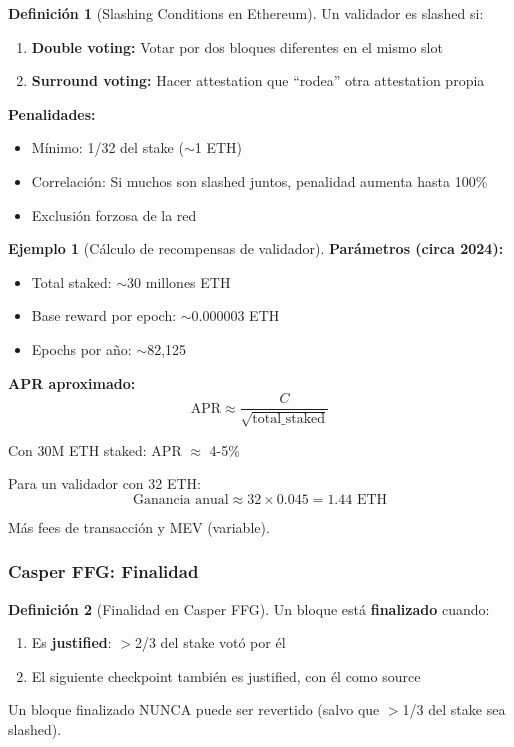 \documentclass[11pt,a4paper,twoside,openright]{book}
\theoremstyle{definition}
\newtheorem{definition}{Definición}[chapter]
\newtheorem{example}{Ejemplo}[chapter]
\theoremstyle{plain}
\theoremstyle{remark}
\begin{document}
\begin{definition}[Slashing Conditions en Ethereum]
Un validador es slashed si:
\begin{enumerate}
    \item \textbf{Double voting:} Votar por dos bloques diferentes en el mismo slot
    \item \textbf{Surround voting:} Hacer attestation que ``rodea'' otra attestation propia
\end{enumerate}

\textbf{Penalidades:}
\begin{itemize}
    \item Mínimo: 1/32 del stake ($\sim$1 ETH)
    \item Correlación: Si muchos son slashed juntos, penalidad aumenta hasta 100\%
    \item Exclusión forzosa de la red
\end{itemize}
\end{definition}

\begin{example}[Cálculo de recompensas de validador]
\textbf{Parámetros (circa 2024):}
\begin{itemize}
    \item Total staked: $\sim$30 millones ETH
    \item Base reward por epoch: $\sim$0.000003 ETH
    \item Epochs por año: $\sim$82,125
\end{itemize}

\textbf{APR aproximado:}
\[ \text{APR} \approx \frac{C}{\sqrt{\text{total\_staked}}} \]

Con 30M ETH staked: APR $\approx$ 4-5\%

Para un validador con 32 ETH:
\[ \text{Ganancia anual} \approx 32 \times 0.045 = 1.44 \text{ ETH} \]

Más fees de transacción y MEV (variable).
\end{example}

\subsubsection{Casper FFG: Finalidad}

\begin{definition}[Finalidad en Casper FFG]
Un bloque está \textbf{finalizado} cuando:
\begin{enumerate}
    \item Es \textbf{justified}: $>$2/3 del stake votó por él
    \item El siguiente checkpoint también es justified, con él como source
\end{enumerate}

Un bloque finalizado NUNCA puede ser revertido (salvo que $>$1/3 del stake sea slashed).
\end{definition}
\end{document}
